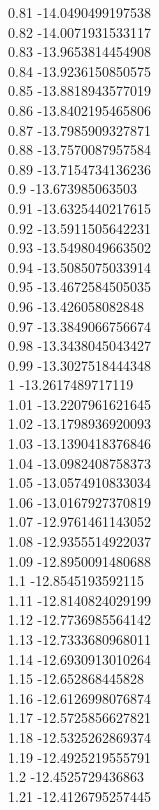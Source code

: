 {0.81	-14.0490499197538\\
0.82	-14.0071931533117\\
0.83	-13.9653814454908\\
0.84	-13.9236150850575\\
0.85	-13.8818943577019\\
0.86	-13.8402195465806\\
0.87	-13.7985909327871\\
0.88	-13.7570087957584\\
0.89	-13.7154734136236\\
0.9	-13.673985063503\\
0.91	-13.6325440217615\\
0.92	-13.5911505642231\\
0.93	-13.5498049663502\\
0.94	-13.5085075033914\\
0.95	-13.4672584505035\\
0.96	-13.426058082848\\
0.97	-13.3849066756674\\
0.98	-13.3438045043427\\
0.99	-13.3027518444348\\
1	-13.2617489717119\\
1.01	-13.2207961621645\\
1.02	-13.1798936920093\\
1.03	-13.1390418376846\\
1.04	-13.0982408758373\\
1.05	-13.0574910833034\\
1.06	-13.0167927370819\\
1.07	-12.9761461143052\\
1.08	-12.9355514922037\\
1.09	-12.8950091480688\\
1.1	-12.8545193592115\\
1.11	-12.8140824029199\\
1.12	-12.7736985564142\\
1.13	-12.7333680968011\\
1.14	-12.6930913010264\\
1.15	-12.652868445828\\
1.16	-12.6126998076874\\
1.17	-12.5725856627821\\
1.18	-12.5325262869374\\
1.19	-12.4925219555791\\
1.2	-12.4525729436863\\
1.21	-12.4126795257445\\
}

